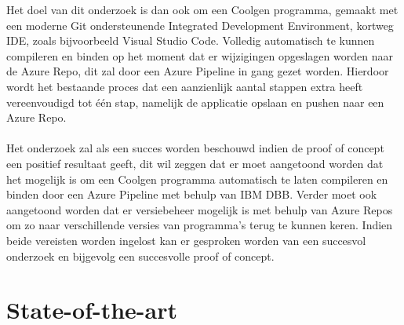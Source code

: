 Het doel van dit onderzoek is dan ook om een Coolgen programma, gemaakt met een moderne Git ondersteunende Integrated Development Environment, kortweg IDE, zoals bijvoorbeeld Visual Studio Code.
Volledig automatisch te kunnen compileren en binden op het moment dat er wijzigingen opgeslagen worden naar de Azure Repo, dit zal door een Azure Pipeline in gang gezet worden.
Hierdoor wordt het bestaande proces dat een aanzienlijk aantal stappen extra heeft vereenvoudigd tot één stap, namelijk de applicatie opslaan en pushen naar een Azure Repo.
\\ \\
Het onderzoek zal als een succes worden beschouwd indien de proof of concept een positief resultaat geeft, dit wil zeggen dat er moet aangetoond worden dat het mogelijk is om een Coolgen programma
automatisch te laten compileren en binden door een Azure Pipeline met behulp van IBM DBB.
Verder moet ook aangetoond worden dat er versiebeheer mogelijk is met behulp van Azure Repos om zo naar verschillende versies van programma's terug te kunnen keren.
Indien beide vereisten worden ingelost kan er gesproken worden van een succesvol onderzoek en bijgevolg een succesvolle proof of concept.


\section{State-of-the-art}%
\label{sec:state-of-the-art}

